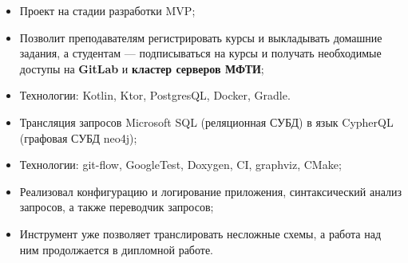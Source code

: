 \documentclass[10pt,a4paper,ragged2e,withhyper]{custom-altacv}
\begin{document}
\begin{paracol}{2}


\begin{itemize}
	\item Проект на стадии разработки MVP;
	\item Позволит преподавателям регистрировать курсы и выкладывать домашние задания, а студентам --- подписываться на курсы и получать необходимые доступы на \textbf{GitLab} и \textbf{кластер серверов МФТИ};
	\item Технологии: Kotlin, Ktor, PostgresQL, Docker, Gradle.
\end{itemize}

\divider


\begin{itemize}
	\item Трансляция запросов Microsoft SQL (реляционная СУБД) в язык CypherQL (графовая СУБД neo4j);
	\item Технологии: git-flow, GoogleTest, Doxygen, CI, graphviz, CMake;
	\item Реализовал конфигурацию и логирование приложения, синтаксический анализ запросов, а также переводчик запросов;
	\item Инструмент уже позволяет транслировать несложные схемы, а работа над ним продолжается в дипломной работе.
\end{itemize}

\iffalse
\divider

\cvproject{Эмулятор PDP-11 \cvtag{C}}{Курсовая работа в МФТИ}{Апрель -- Июль 2021}{pdp11-emulator}{https://github.com/temikfart/pdp11-emulator/}

\begin{itemize}
	\item Работа была сделана в соотстветсвии с техническим заданием;
	\item Был разработан обширная функциональность: множество команд для исполнения, слова состояния процессора и т.д.
\end{itemize}
\fi


\iffalse
{}



\end{paracol}
\end{document}
